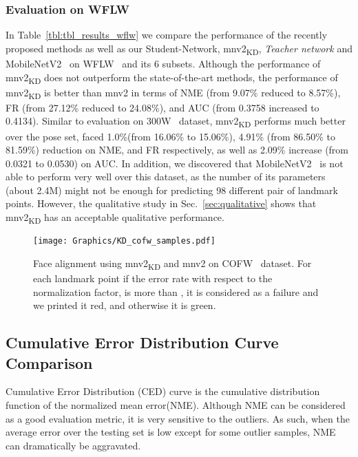 \documentclass[times,twocolumn,final,authoryear]{elsarticle}
\begin{document}
\subsubsection{Evaluation on WFLW}
In Table~\ref{tbl:tbl_results_wflw} we compare the performance of the recently proposed methods as well as our Student-Network, mnv2\textsubscript{KD}, \textit{Teacher network} and MobileNetV2~\cite{sandler2018MobileNetV2} on WFLW~\cite{wu2018look} and its 6 subsets. Although the performance of mnv2\textsubscript{KD} does not outperform the state-of-the-art methods, the performance of mnv2\textsubscript{KD} is better than mnv2 in terms of NME (from 9.07\% reduced to 8.57\%), FR (from 27.12\% reduced to 24.08\%), and AUC (from 0.3758 increased to 0.4134). Similar to evaluation on 300W~\cite{sagonas2013300} dataset, mnv2\textsubscript{KD} performs much better over the pose set, faced 1.0\%(from 16.06\% to 15.06\%), 4.91\% (from 86.50\% to 81.59\%) reduction on NME, and FR respectively, as well as 2.09\% increase (from 0.0321 to 0.0530) on AUC. In addition, we discovered that MobileNetV2~\cite{sandler2018MobileNetV2} is not able to perform very well over this dataset, as the number of its parameters (about 2.4M) might not be enough for predicting 98 different pair of landmark points. However, the qualitative study in Sec.~\ref{sec:qualitative} shows that mnv2\textsubscript{KD} has an acceptable qualitative performance.

\begin{figure*}[t]
  \centering
      \texttt{[image: Graphics/KD\_cofw\_samples.pdf]}
  \caption{Face alignment using mnv2\textsubscript{KD} and mnv2 on COFW~\cite{burgos2013robust} dataset. For each landmark point if the error rate with respect to the normalization factor, is more than , it is considered as a failure and we printed it red, and otherwise it is green.}
  \label{fig:result_Cofw}
\end{figure*}


\subsection{Cumulative Error Distribution Curve Comparison}
Cumulative Error Distribution (CED) curve is the cumulative distribution function of the normalized mean error(NME). Although NME can be considered as a good evaluation metric, it is very sensitive to the outliers. As such, when the average error over the testing set is low except for some outlier samples, NME can dramatically be aggravated.
\end{document}
